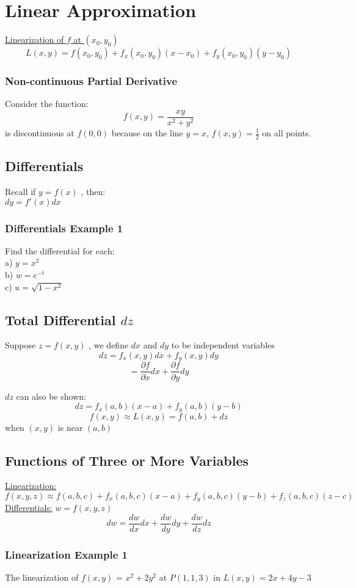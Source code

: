 \documentclass[12pt]{article}
\begin{document}
\section{Linear Approximation}
\underline{Linearization of \(f\) at \((x_0,y_0)\) }
\[
	L(x,y) = f(x_0,y_0) + f_x(x_0,y_0)(x-x_0) + f_y(x_0,y_0)(y-y_0)
\]
\subsubsection{Non-continuous Partial Derivative}
Consider the function:
\[
	f(x,y) = \frac{xy}{x^2+y^2}
\]
is discontinuous at \(f(0,0)\) because on the line \(y=x\), \(f(x,y) = \frac{1}{2}\) on all points.

\subsection{Differentials}
Recall if \(y=f(x)\) , then: \\
\(dy=f'(x)dx\) 

\subsubsection{Differentials Example 1}
Find the differential for each:\\
a) \(y=x^2\) \\
b) \(w=e^{-t}\) \\
c) \(u=\sqrt{1-x^2}\) 

\subsection{Total Differential \(dz\) }
Suppose \(z=f(x,y)\) , we define \(dx\) and \(dy\) to be independent variables\
\[
	dz = f_x(x,y)dx + f_y(x,y)dy
\]
\[
	=\frac{\partial f}{\partial x} dx + \frac{\partial f}{\partial y} dy
\]

\(dz\) can also be shown:
\[
	dz=f_x(a,b)(x-a) + f_y(a,b)(y-b)
\]
\[
	f(x,y) \approx L(x,y) = f(a,b) + dz
\]
when \((x,y)\) is near \((a,b)\) 

\subsection{Functions of Three or More Variables}
\underline{Linearization:}
\[
	f(x,y,z) \approx f(a,b,c) + f_x(a,b,c)(x-a) + f_y(a,b,c)(y-b) + f_z(a,b,c)(z-c)
\]
\underline{Differentials:} \(w=f(x,y,z)\) 
\[
	dw=\frac{dw}{dx}dx + \frac{dw}{dy}dy + \frac{dw}{dz}dz
\]
\subsubsection{Linearization Example 1}
The linearization of \(f(x,y)\) = \(x^2+2y^2\) at \(P(1,1,3)\) in \(L(x,y) = 2x+4y-3\) 
\end{document}

